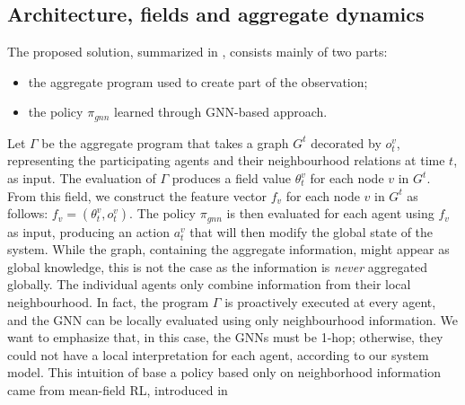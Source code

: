 \subsection{Architecture, fields and aggregate dynamics}
The proposed solution, summarized in , consists mainly of two parts:
\begin{itemize}
  \item the aggregate program used to create part of the observation; 
  \item the policy $\pi_{gnn}$ learned through \ac{GNN}-based approach.
\end{itemize} 
%
Let $\Gamma$ be the aggregate program that takes a graph $G^t$ decorated by $o^v_t$, 
 representing the participating agents and their neighbourhood relations at time $t$, as input. 
%
The evaluation of $\Gamma$ produces a field value $\theta^v_t$ for each node $v$ in $G^t$. 
From this field, we construct the feature vector $f_v$ for each node $v$ in $G^t$ as follows:
 $f_v = (\theta^v_t, o^v_t)$.
%
The policy $\pi_{gnn}$ is then evaluated for each agent using $f_v$ as input, 
 producing an action $a^v_t$ that will then modify the global state of the system.
%
While the graph, containing the aggregate information, 
 might appear as global knowledge, 
 this is not the case as the information is \emph{never} aggregated globally. 
The individual agents only combine information from their local neighbourhood.
%
In fact, the program $\Gamma$ is proactively executed at every agent, 
and the \ac{GNN} can be locally evaluated using only neighbourhood information. 
%
We want to emphasize that, in this case, the \acp{GNN} must be 1-hop; 
otherwise, they could not have a local interpretation for each agent, according to our system model.
%
This intuition of base a policy based only on neighborhood information came from mean-field RL, introduced in 

